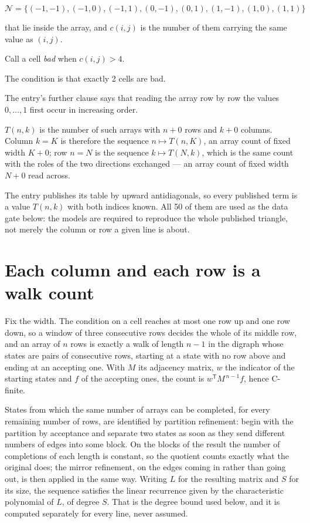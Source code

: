 \documentclass[11pt]{article}
\theoremstyle{definition}
\begin{document}
\[\mathcal{N} = \{(-1,-1), (-1,0), (-1,1), (0,-1), (0,1), (1,-1), (1,0), (1,1)\}\]

that lie inside the array, and $c(i,j)$ is the number of them carrying the same value as $(i,j)$.

Call a cell {\itshape bad} when $c(i,j) > 4$.

The condition is that exactly 2 cells are bad.

The entry's further clause says that reading the array row by row the values $0,\dots,1$ first occur in increasing order.

$T(n,k)$ is the number of such arrays with $n + 0$ rows and $k + 0$ columns. Column $k = K$ is therefore the sequence $n \mapsto T(n,K)$, an array count of fixed width $K + 0$; row $n = N$ is the sequence $k \mapsto T(N,k)$, which is the same count with the roles of the two directions exchanged --- an array count of fixed width $N + 0$ read across.

The entry publishes its table by upward antidiagonals, so every published term is a value $T(n,k)$ with both indices known. All 50 of them are used as the data gate below: the models are required to reproduce the whole published triangle, not merely the column or row a given line is about.

\section{Each column and each row is a walk count}

Fix the width. The condition on a cell reaches at most one row up and one row down, so a window of three consecutive rows decides the whole of its middle row, and an array of $n$ rows is exactly a walk of length $n-1$ in the digraph whose states are pairs of consecutive rows, starting at a state with no row above and ending at an accepting one. With $M$ its adjacency matrix, $w$ the indicator of the starting states and $f$ of the accepting ones, the count is $w^{\mathsf T}M^{\,n-1}f$, hence C-finite.

States from which the same number of arrays can be completed, for every remaining number of rows, are identified by partition refinement: begin with the partition by acceptance and separate two states as soon as they send different numbers of edges into some block. On the blocks of the result the number of completions of each length is constant, so the quotient counts exactly what the original does; the mirror refinement, on the edges coming in rather than going out, is then applied in the same way. Writing $L$ for the resulting matrix and $S$ for its size, the sequence satisfies the linear recurrence given by the characteristic polynomial of $L$, of degree $S$. That is the degree bound used below, and it is computed separately for every line, never assumed.
\end{document}
